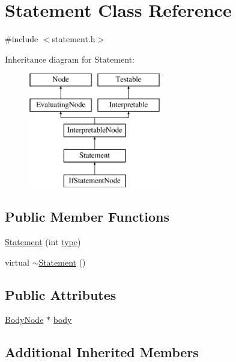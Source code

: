 \hypertarget{classStatement}{}\section{Statement Class Reference}
\label{classStatement}


{\ttfamily \#include $<$statement.\+h$>$}

Inheritance diagram for Statement\+:\begin{figure}[H]
\begin{center}
\leavevmode
\includegraphics[height=5.000000cm]{classStatement}
\end{center}
\end{figure}
\subsection*{Public Member Functions}
\begin{DoxyCompactItemize}
\item 
\hyperlink{classStatement_a6fb78974779f1f546206a6f301d0fbee}{Statement} (int \hyperlink{classNode_af4f536b1b3f60e197fe364ba56022291}{type})
\item 
virtual \hyperlink{classStatement_aebe8ef20fbd0a932ebb33f6cef555a6d}{$\sim$\+Statement} ()
\end{DoxyCompactItemize}
\subsection*{Public Attributes}
\begin{DoxyCompactItemize}
\item 
\hyperlink{classBodyNode}{Body\+Node} $\ast$ \hyperlink{classStatement_a0aa31d3fbf036cf665062db876341f63}{body}
\end{DoxyCompactItemize}
\subsection*{Additional Inherited Members}


